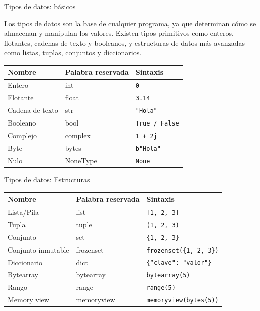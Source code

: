 \documentclass[11pt]{beamer}
\begin{document}
\begin{frame}{Tipos de datos: básicos}

Los tipos de datos son la base de cualquier programa, ya que determinan cómo se almacenan y manipulan los valores. Existen tipos primitivos como enteros, flotantes, cadenas de texto y booleanos, y estructuras de datos más avanzadas como listas, tuplas, conjuntos y diccionarios.
\scriptsize
\begin{longtable}{p{3.5cm}p{3.5cm}p{7cm}}
	\toprule
	\textbf{Nombre} & \textbf{Palabra reservada} & \textbf{Sintaxis} \\
	\midrule
	Entero & int & \texttt{0} \\
	Flotante & float & \texttt{3.14} \\
	Cadena de texto & str & \texttt{"Hola"} \\
	Booleano & bool & \texttt{True / False} \\
	Complejo & complex & \texttt{1 + 2j} \\
	Byte & bytes & \texttt{b"Hola"} \\
	Nulo & NoneType & \texttt{None} \\
\end{longtable}
\end{frame}	


\begin{frame}{Tipos de datos: Estructuras}
\small
\begin{longtable}{p{3.5cm}p{3.5cm}p{7cm}}
	\toprule
	\textbf{Nombre} & \textbf{Palabra reservada} & \textbf{Sintaxis} \\
	\midrule
	Lista/Pila & list & \texttt{[1, 2, 3]} \\
	Tupla & tuple & \texttt{(1, 2, 3)} \\
	Conjunto & set & \texttt{\{1, 2, 3\}} \\
	Conjunto inmutable & frozenset & \texttt{frozenset(\{1, 2, 3\})} \\
	Diccionario & dict & \texttt{\{``clave": "valor"\}} \\
	Bytearray & bytearray & \texttt{bytearray(5)} \\
	Rango & range & \texttt{range(5)} \\
	Memory view & memoryview & \texttt{memoryview(bytes(5))} \\
	\bottomrule
\end{longtable}	
\end{frame}	
\end{document}
